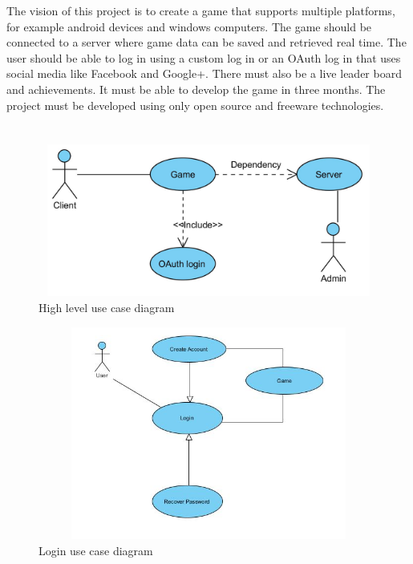 \documentclass[letterpaper]{article}
\begin{document}
		The vision of this project is to create a game that supports multiple platforms, for example android devices and windows computers. The game should be connected to a server where game data can be saved and retrieved real time. The user should be able to log in using a custom log in or an OAuth log in that uses social media like Facebook and Google+. There must also be a live leader board and achievements. It must be able to develop the game in three months. The project must be developed using only open source and freeware technologies.
					
		\section*{\colorbox{black}{}} 
		
		\vspace{0.2in}
		
		\begin{figure}[ht!]
		\centering
		\includegraphics[width=180mm, height=50mm]{UML_Diagram/Use_Case/High_Level}
		\caption{High level use case diagram}
		\label{overflow}
		\end{figure}
		
		\begin{figure}[H]
		\centering
		\includegraphics[width=180mm, height=70mm]{UML_Diagram/Use_Case/login_simple}
		\caption{Login use case diagram}
		\label{overflow}
		\end{figure}		
				
\end{document}

